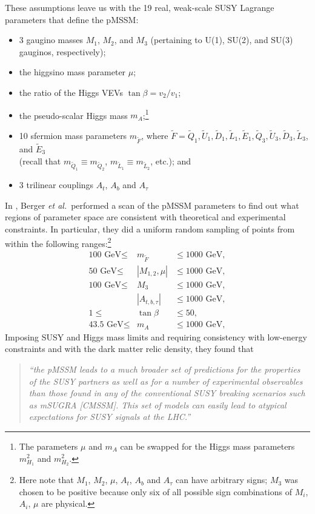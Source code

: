 These assumptions leave us with the 19 real, weak-scale SUSY Lagrange parameters 
that define the pMSSM:
\begin{itemize}
   \item 3 gaugino masses $M_1$, $M_2$, and $M_3$ 
         (pertaining to U(1), SU(2), and SU(3) gauginos, respectively);         
   \item the higgsino mass parameter $\mu$;
   \item the ratio of the Higgs VEVs $\tan\beta=v_2/v_1$;
   \item the pseudo-scalar Higgs mass $m_A$;\footnote{The parameters $\mu$ and $m_A$  
         can be swapped for the Higgs mass parameters $m_{H_1}^2$ and $m_{H_2}^2$.}
   \item 10 sfermion mass parameters $m_{\tilde{F}}$, where 
         $\tilde{F} = \tilde{Q}_1, \tilde{U}_1, \tilde{D}_1, 
                      \tilde{L}_1, \tilde{E}_1, 
                      \tilde{Q}_3, \tilde{U}_3, \tilde{D}_3, 
                      \tilde{L}_3$, and $\tilde{E}_3$ \\ 
(recall that $m_{\tilde{Q}_1}\equiv m_{\tilde{Q}_2}$, 
           $m_{\tilde{L}_1}\equiv m_{\tilde{L}_2}$, etc.); and          
   \item 3 trilinear couplings $A_t$, $A_b$ and $A_\tau$                  
\end{itemize}
 
In \cite{Berger:2008cq}, Berger {\it et al.}\ performed a scan of the pMSSM parameters  
to find out what regions of parameter space are consistent with theoretical and experimental constraints. In particular, they did a uniform random sampling of 
points from within the following ranges:\footnote{Here note that $M_1$, $M_2$, 
$\mu$, $A_t$, $A_b$ and $A_\tau$ can have 
arbitrary signs; $M_3$ was chosen to be positive because only six 
of all possible sign combinations of $M_i$, $A_i$, $\mu$ are physical.} 
\begin{eqnarray}
  \mbox{100 GeV} \leq 	& m_{\tilde{F}}  & \leq \mbox{1000 GeV},   \nonumber \\
  \mbox{50 GeV}  \leq	& |M_{1,2},\mu|  & \leq \mbox{1000 GeV}, 	 \nonumber \\
  \mbox{100 GeV} \leq	& M_3 	     & \leq \mbox{1000 GeV},   \\
	                  & |A_{t,b,\tau}| & \leq \mbox{1000 GeV}, 	 \nonumber \\
    1  \leq			& \tan\beta		& \leq 50,	  \nonumber \\
    \mbox{43.5 GeV}	\leq	& m_A			& \leq \mbox{1000 GeV},  \nonumber 
\end{eqnarray}
Imposing SUSY and Higgs mass limits and requiring consistency with low-energy 
constraints and with the dark matter relic density, 
they found \cite{Berger:2008cq} that
\begin{quote} 
{\it ``the pMSSM leads to a much broader set of predictions for the properties 
of the SUSY partners as well as for a number of experimental observables than 
those found in any of the conventional SUSY breaking scenarios such as mSUGRA [CMSSM]. This set of models can easily lead to atypical expectations for SUSY signals 
at the LHC.''}
\end{quote}
